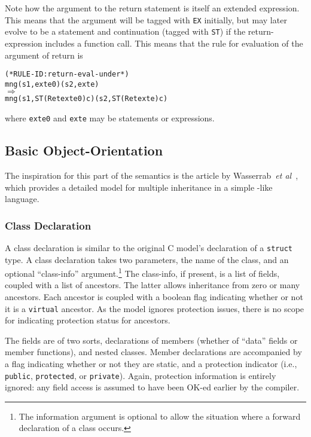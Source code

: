\documentclass[11pt]{article}
\begin{document}
Note how the argument to the return statement is itself an extended
expression.  This means that the argument will be tagged with
\texttt{EX} initially, but may later evolve to be a statement and
continuation (tagged with \texttt{ST}) if the return-expression
includes a function call.  This means that the rule for evaluation of
the argument of return is
\begin{alltt}
(* RULE-ID: return-eval-under *)
     mng (s1, exte0) (s2, exte)
   \(\Rightarrow\)
     mng (s1, ST (Ret exte0) c) (s2, ST (Ret exte) c)
\end{alltt}
where \texttt{exte0} and \texttt{exte} may be statements or expressions.

\subsection{Basic Object-Orientation}
\label{sec:basic-oo}

The inspiration for this part of the semantics is the article by
Wasserrab~\emph{et al}~\cite{wasserrab-nst-OOPSLA06}, which provides a
detailed model for multiple inheritance in a simple \cpp-like
language. 

\subsubsection{Class Declaration}
\label{sec:class-declaration}
A class declaration is similar to the original C model's declaration
of a \texttt{struct} type.  A class declaration takes two parameters,
the name of the class, and an optional ``class-info''
argument.\footnote{The information argument is optional to allow the
  situation where a forward declaration of a class occurs.}  The
class-info, if present, is a list of fields, coupled with a list of
ancestors.  The latter allows inheritance from zero or many ancestors.
Each ancestor is coupled with a boolean flag indicating whether or not
it is a \texttt{virtual} ancestor.  As the model ignores protection
issues, there is no scope for indicating protection status for
ancestors. 

The fields are of two sorts, declarations of members (whether of
``data'' fields or member functions), and nested classes.  Member
declarations are accompanied by a flag indicating whether or not they
are static, and a protection indicator (i.e., \texttt{public},
\texttt{protected}, or \texttt{private}).  Again, protection
information is entirely ignored: any field access is assumed to have
been OK-ed earlier by the compiler. 
\end{document}
